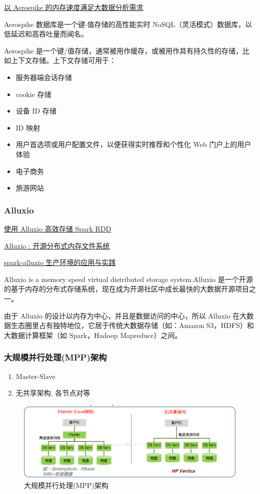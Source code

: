 \documentclass[hyperref, UTF-8]{ctexart}
\begin{document}
\href{https://www.ibm.com/developerworks/cn/analytics/library/ba-aerospike-trs/index.html\%E4\%BB\%A5\%20Aerospike\%20\%E7\%9A\%84\%E5\%86\%85\%E5\%AD\%98\%E9\%80\%9F\%E5\%BA\%A6\%E6\%BB\%A1\%E8\%B6\%B3\%E5\%A4\%A7\%E6\%95\%B0\%E6\%8D\%AE\%E5\%88\%86\%E6\%9E\%90\%E9\%9C\%80\%E6\%B1\%82}{以 Aerospike 的内存速度满足大数据分析需求}   

Aerospike 数据库是一个键-值存储的高性能实时 NoSQL（灵活模式）数据库，以低延迟和高吞吐量而闻名。  

Aerospike 是一个键/值存储，通常被用作缓存，或被用作具有持久性的存储，比如上下文存储。上下文存储可用于：
\begin{itemize}
\item 服务器端会话存储
\item cookie 存储
\item 设备 ID 存储
\item ID 映射
\item 用户首选项或用户配置文件，以便获得实时推荐和个性化 Web 门户上的用户体验
\item 电子商务
\item 旅游网站
\end{itemize}
\subsubsection{Alluxio}
\label{sec:org72b2a6b}
\href{https://www.alluxio.com/blog/alluxiospark-rdd}{使用 Alluxio 高效存储 Spark RDD}   

\href{https://zhuanlan.zhihu.com/p/20624086}{Alluxio : 开源分布式内存文件系统}   

\href{http://www.th7.cn/Program/java/201610/989941.shtml}{spark-alluxio 生产环境的应用与实践}   

Alluxio is a memory speed virtual distributed storage system.Alluxio 是一个开源的基于内存的分布式存储系统，现在成为开源社区中成长最快的大数据开源项目之一。   

由于 Alluxio 的设计以内存为中心，并且是数据访问的中心，所以 Alluxio 在大数据生态圈里占有独特地位，它居于传统大数据存储（如：Amazon S3，HDFS）和大数据计算框架（如 Spark，Hadoop Mapreduce）之间。
\subsubsection{大规模并行处理(MPP)架构}
\label{sec:org072217d}
\begin{enumerate}
\item Master-Slave
\item 无共享架构, 各节点对等
\end{enumerate}
\begin{figure}[htbp]
\centering
\includegraphics[width=.9\linewidth]{Component/20150413222935866_2017-11-29_10-41-41.png}
\caption{大规模并行处理(MPP)架构}
\end{figure}
\end{document}
